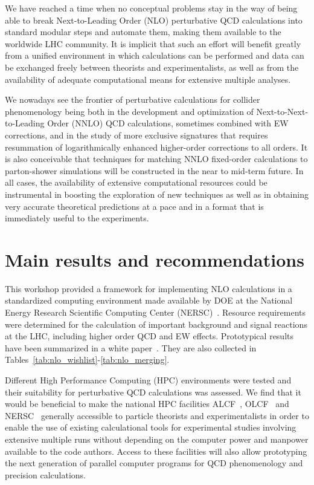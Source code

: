 \documentclass[12pt]{article}
\begin{document}
We have reached a time when no conceptual problems stay in
the way of being able to break Next-to-Leading Order (NLO)
perturbative QCD calculations into standard modular steps and automate
them, making them available to the worldwide LHC community.  It is
implicit that such an effort will benefit greatly from a unified
environment in which calculations can be performed and data can be
exchanged freely between theorists and experimentalists,
as well as from the availability of adequate computational means
for extensive multiple analyses.

We nowadays see the frontier of perturbative
calculations for collider phenomenology being both in the
development and optimization of Next-to-Next-to-Leading Order (NNLO)
QCD calculations, sometimes combined with EW corrections, and in the
study of more exclusive signatures that requires resummation 
of logarithmically enhanced higher-order corrections to all orders.
It is also conceivable that techniques for matching NNLO fixed-order 
calculations to parton-shower simulations will be constructed in the 
near to mid-term future. In all cases, the availability 
of extensive computational resources could be instrumental
in boosting the exploration of new techniques as well as in
obtaining very accurate theoretical predictions at a pace and in a
format that is immediately useful to the experiments.

\section{Main results and recommendations}
This workshop provided a framework for implementing NLO calculations
in a standardized computing environment made available by DOE at the
National Energy Research Scientific Computing Center
(NERSC)~\cite{NERSC}.  Resource requirements were determined for the
calculation of important background and signal reactions at the
LHC, including higher order QCD and EW effects. Prototypical results 
have been summarized in a white paper~\cite{HPCWP}. They are also
collected in Tables~\ref{tab:nlo_wishlist}-\ref{tab:nlo_merging}.

Different High Performance Computing (HPC) environments were tested
and their suitability for perturbative QCD calculations was assessed.
We find that it would be beneficial to make the national HPC 
facilities ALCF~\cite{ALCF}, OLCF~\cite{OLCF} and NERSC~\cite{NERSC} 
generally accessible to particle theorists and
experimentalists in order to enable the use of existing
calculational tools for experimental studies involving extensive
multiple runs without depending on the computer power and manpower
available to the code authors. Access to these facilities will also
allow prototyping the next generation of parallel computer programs
for QCD phenomenology and precision calculations.
\end{document}
